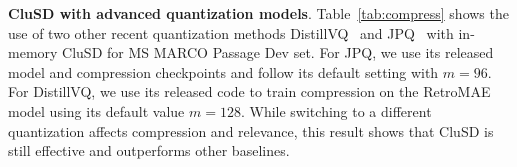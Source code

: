


{\bf CluSD with advanced quantization models}.
Table~\ref{tab:compress} shows the use of two other recent quantization methods 
DistillVQ~\cite{Xiao2022Distill-VQ} and JPQ~\cite{2021CIKM-JPQ-Zhan} 
with in-memory CluSD for MS MARCO Passage Dev set. 
For JPQ, we use its released model and compression checkpoints and follow its default setting with $m=96$. 
For DistillVQ, we use its released code to train compression on the RetroMAE model using its default  value $m=128$.
While switching to a different quantization affects compression and  relevance, 
this result shows that CluSD is still effective and outperforms other baselines.











